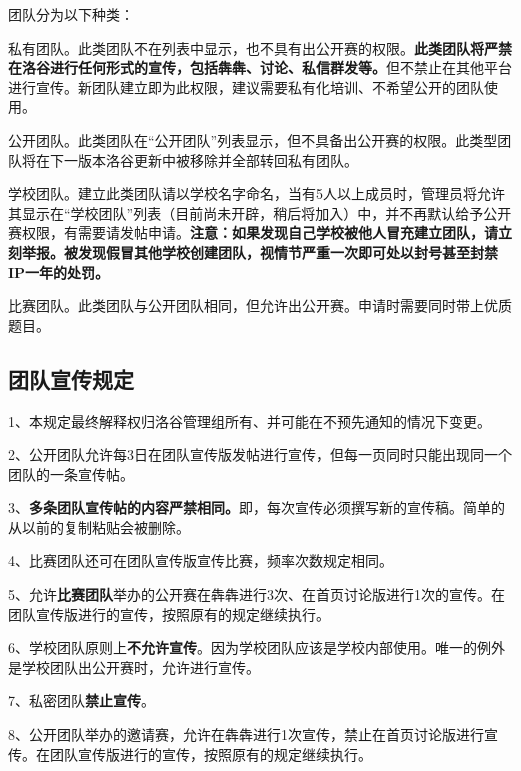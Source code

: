 \documentclass[10pt,a4paper]{article}
\begin{document}
		
		团队分为以下种类：
		\begin{itemize}{
				\item 
				
				
				私有团队。此类团队不在列表中显示，也不具有出公开赛的权限。\textbf{{此类团队将严禁在洛谷进行任何形式的宣传，包括犇犇、讨论、私信群发等。}}但不禁止在其他平台进行宣传。新团队建立即为此权限，建议需要私有化培训、不希望公开的团队使用。
				\item 
				
				
				公开团队。此类团队在“公开团队”列表显示，但不具备出公开赛的权限。此类型团队将在下一版本洛谷更新中被移除并全部转回私有团队。
				\item 
				
				
				学校团队。建立此类团队请以学校名字命名，当有5人以上成员时，管理员将允许其显示在“学校团队”列表（目前尚未开辟，稍后将加入）中，并不再默认给予公开赛权限，有需要请发帖申请。\textbf{{注意：如果发现自己学校被他人冒充建立团队，请立刻举报。被发现假冒其他学校创建团队，视情节严重一次即可处以封号甚至封禁IP一年的处罚。}}
				\item 比赛团队。此类团队与公开团队相同，但允许出公开赛。申请时需要同时带上优质题目。}
		\end{itemize}
		
		\subsection{
			团队宣传规定}
		
		
		1、本规定最终解释权归洛谷管理组所有、并可能在不预先通知的情况下变更。
		
		
		2、公开团队允许每3日在团队宣传版发帖进行宣传，但每一页同时只能出现同一个团队的一条宣传帖。
		
		
		3、\textbf{{多条团队宣传帖的内容严禁相同。}}即，每次宣传必须撰写新的宣传稿。简单的从以前的复制粘贴会被删除。
		
		
		4、比赛团队还可在团队宣传版宣传比赛，频率次数规定相同。
		
		
		5、允许\textbf{{比赛团队}}举办的公开赛在犇犇进行3次、在首页讨论版进行1次的宣传。在团队宣传版进行的宣传，按照原有的规定继续执行。
		
		
		6、学校团队原则上\textbf{{不允许宣传}}。因为学校团队应该是学校内部使用。唯一的例外是学校团队出公开赛时，允许进行宣传。
		
		
		7、私密团队\textbf{{禁止宣传}}。
		
		
		8、公开团队举办的邀请赛，允许在犇犇进行1次宣传，禁止在首页讨论版进行宣传。在团队宣传版进行的宣传，按照原有的规定继续执行。
		
\end{document}
